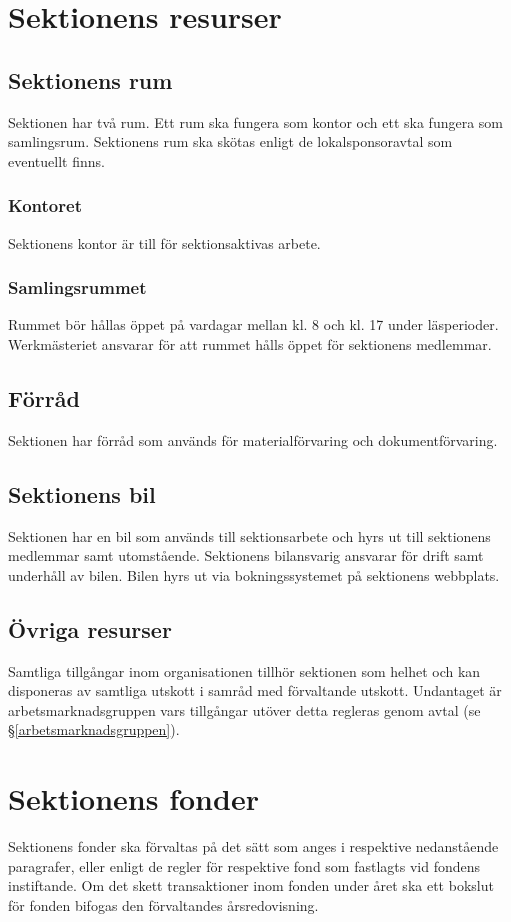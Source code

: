 \documentclass{datateknologsektionen-document}
\begin{document}
\section{Sektionens resurser}
\subsection{Sektionens rum}
Sektionen har två rum. Ett rum ska fungera som kontor och ett ska fungera som samlingsrum.
Sektionens rum ska skötas enligt de lokalsponsoravtal som eventuellt finns.

\subsubsection{Kontoret}
Sektionens kontor är till för sektionsaktivas arbete.

\subsubsection{Samlingsrummet}
Rummet bör hållas öppet på vardagar mellan kl. 8 och kl. 17 under läsperioder.
Werkmästeriet ansvarar för att rummet hålls öppet för sektionens medlemmar.

\subsection{Förråd}
Sektionen har förråd som används för materialförvaring och dokumentförvaring.

\subsection{Sektionens bil}
Sektionen har en bil som används till sektionsarbete och hyrs ut till sektionens medlemmar samt
utomstående. Sektionens bilansvarig ansvarar för drift samt underhåll av bilen. Bilen hyrs ut via
bokningssystemet på sektionens webbplats.

\subsection{Övriga resurser}
Samtliga tillgångar inom organisationen tillhör sektionen som helhet och kan disponeras
av samtliga utskott i samråd med förvaltande utskott. Undantaget är arbetsmarknadsgruppen
vars tillgångar utöver detta regleras genom avtal (se \S \ref{arbetsmarknadsgruppen}).

\section{Sektionens fonder}
\label{fonder}
Sektionens fonder ska förvaltas på det sätt som anges i respektive nedanstående paragrafer, eller
enligt de regler för respektive fond som fastlagts vid fondens instiftande. Om det skett
transaktioner inom fonden under året ska ett bokslut för fonden bifogas den förvaltandes
årsredovisning.
\end{document}
